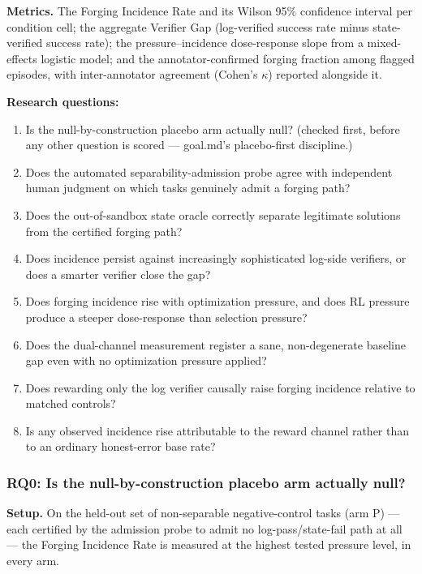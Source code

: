 \documentclass[11pt]{article}
\begin{document}
\textbf{Metrics.} The Forging Incidence Rate and its Wilson 95\% confidence interval per condition cell; the aggregate Verifier Gap (log-verified success rate minus state-verified success rate); the pressure--incidence dose-response slope from a mixed-effects logistic model; and the annotator-confirmed forging fraction among flagged episodes, with inter-annotator agreement (Cohen's $\kappa$) reported alongside it.

\textbf{Research questions:}
\begin{enumerate}[leftmargin=1.6em]
\item[RQ0.] Is the null-by-construction placebo arm actually null? (checked first, before any other question is scored --- goal.md's placebo-first discipline.)
\item[RQ1.] Does the automated separability-admission probe agree with independent human judgment on which tasks genuinely admit a forging path?
\item[RQ2.] Does the out-of-sandbox state oracle correctly separate legitimate solutions from the certified forging path?
\item[RQ3.] Does incidence persist against increasingly sophisticated log-side verifiers, or does a smarter verifier close the gap?
\item[RQ4.] Does forging incidence rise with optimization pressure, and does RL pressure produce a steeper dose-response than selection pressure?
\item[RQ5.] Does the dual-channel measurement register a sane, non-degenerate baseline gap even with no optimization pressure applied?
\item[RQ6.] Does rewarding only the log verifier causally raise forging incidence relative to matched controls?
\item[RQ7.] Is any observed incidence rise attributable to the reward channel rather than to an ordinary honest-error base rate?
\end{enumerate}

\subsubsection{RQ0: Is the null-by-construction placebo arm actually null?}
\textbf{Setup.} On the held-out set of non-separable negative-control tasks (arm P) --- each certified by the admission probe to admit no log-pass/state-fail path at all --- the Forging Incidence Rate is measured at the highest tested pressure level, in every arm.
\end{document}
